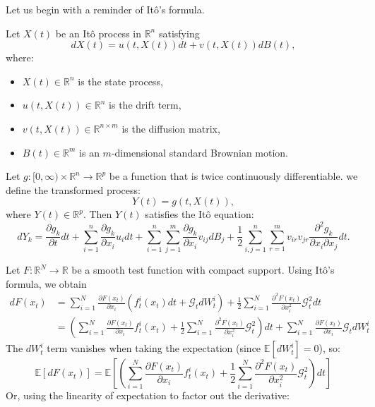\documentclass[a4paper,10pt]{article}
\begin{document}
Let us begin with a reminder of Itô's formula.
\begin{theorem}
Let \( X(t) \) be an Itô process in \( \mathbb{R}^n \) satisfying  
\[
dX(t) = u(t, X(t)) dt + v(t, X(t)) dB(t),
\]
where:
\begin{itemize}
    \item[] \( X(t) \in \mathbb{R}^n \) is the state process,
    \item[] \( u(t, X(t)) \in \mathbb{R}^n \) is the drift term,
    \item[] \( v(t, X(t)) \in \mathbb{R}^{n \times m} \) is the diffusion matrix,
    \item[] \( B(t) \in \mathbb{R}^m \) is an \( m \)-dimensional standard Brownian motion.
\end{itemize}
Let \( g: [0, \infty) \times \mathbb{R}^n \to \mathbb{R}^p \) be a function that is twice continuously differentiable.  
we define the transformed process:
\[
Y(t) = g(t, X(t)),
\]
where \( Y(t) \in \mathbb{R}^p \).  
Then \( Y(t) \) satisfies the Itô equation:
\[
dY_k = \frac{\partial g_k}{\partial t} dt 
+ \sum\limits_{i=1}^{n} \frac{\partial g_k}{\partial x_i} u_i dt 
+ \sum\limits_{i=1}^{n} \sum\limits_{j=1}^{m} \frac{\partial g_k}{\partial x_i} v_{ij} dB_j
+ \frac{1}{2} \sum\limits_{i,j=1}^{n} \sum\limits_{r=1}^{m} v_{ir} v_{jr} \frac{\partial^2 g_k}{\partial x_i \partial x_j} dt.
\]
\end{theorem}
Let \( F: \mathbb{R}^N \rightarrow \mathbb{R} \) be a smooth test function with compact support. Using Itô’s formula, we obtain
\begin{align*}
    dF(x_t) &= \sum\limits_{i=1}^N \frac{\partial F(x_t)}{\partial x_i} (f^i_t(x_t)dt + \mathcal{G}_t dW^i_t) + \frac{1}{2} \sum\limits_{i=1}^N  \frac{\partial^2 F(x_t)}{\partial x_i^2} \mathcal{G}_t^2 dt \\
    &= \left(\sum\limits_{i=1}^N \frac{\partial F(x_t)}{\partial x_i} f^i_t(x_t) + \frac{1}{2} \sum\limits_{i=1}^N  \frac{\partial^2 F(x_t)}{\partial x_i^2} \mathcal{G}_t^2\right)dt + \sum\limits_{i=1}^N \frac{\partial F(x_t)}{\partial x_i}  \mathcal{G}_t dW^i_t
\end{align*}
The \( dW_t^i \) term vanishes when taking the expectation (since \( \mathbb{E}[dW_t^i] = 0 \)), so:
\[
\mathbb{E}[dF(x_t)] = \mathbb{E}\left[\left(\sum\limits_{i=1}^N \frac{\partial F(x_t)}{\partial x_i} f^i_t(x_t) + \frac{1}{2} \sum\limits_{i=1}^N \frac{\partial^2 F(x_t)}{\partial x_i^2} \mathcal{G}_t^2\right)dt\right]
\]
Or, using the linearity of expectation to factor out the derivative:
\end{document}
